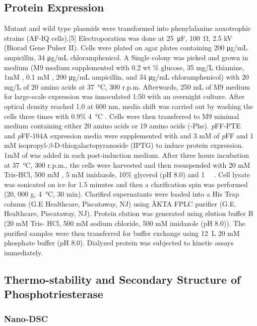 \begin{refsection}
\subsection{Protein Expression}
Mutant and wild type plasmids were transformed into  phenylalanine
auxotrophic strains (AF-IQ cells).[5] Electroporation was done at
\SI{25}{\micro\farad}, \SI{100}{\ohm}, 2.5 kV (Biorad Gene Pulser II). Cells were
plated on agar plates containing 200 μg/mL ampicillin, 34 μg/mL
chloramphenicol. A Single colony was picked and grown in medium (M9 medium
supplemented with 0.2 wt \% glucose, 35 mg/L thiamine, 1mM , 0.1 mM
, 200 μg/mL ampicillin, and 34 μg/mL chloramphenicol) with 20 mg/L of
20 amino acids at \SI{37}{\celsius}, 300 r.p.m.  Afterwards, 250 mL of M9
medium for large-scale expression was innoculated 1:50 with an overnight
culture. After optical density reached 1.0 at 600 nm, media shift was carried
out by washing the cells three times with 0.9\% \SI{4}{\celsius} .
Cells were then transferred to M9 minimal medium containing either 20 amino
acids or 19 amino acids (-Phe). \emph{p}FF-PTE and \emph{p}FF-104A expression
media were supplemented with and 3 mM of \emph{p}FF and 1 mM
isopropyl-$\beta$-D-thiogalactopyranoside (IPTG) to induce protein expression.
1mM of  was added in each post-induction medium. After three hours
incubation at \SI{37}{\celsius}, 300 r.p.m., the cells were harvested and then
resuspended with 20 mM Tris-HCl, 500 mM , 5 mM imidazole, 10\%
glycerol (pH 8.0) and \SI{1}{\micro\moLar} . Cell lysate was
sonicated on ice for 1.5 minutes and then a clarification spin was performed
(20, 000 g, \SI{4}{\celsius}, 30 min).  Clarified supernatants were loaded into
a His Trap column (G.E Healthcare, Piscataway, NJ) using ÄKTA FPLC purifier
(G.E.  Healthcare, Piscataway, NJ).  Protein elution was generated using
elution buffer B (20 mM Tris- HCl, 500 mM sodium chloride, 500 mM imidazole (pH
8.0)).  The purified samples were then transferred for buffer exchange using
\SI{12}{\liter} 20 mM phosphate buffer (pH 8.0).  Dialyzed protein was
subjected to kinetic assays immediately.

\subsection{Thermo-stability and Secondary Structure of Phosphotriesterase}
\label{sec:thermo}

\subsubsection{Nano-DSC}


\end{refsection}
